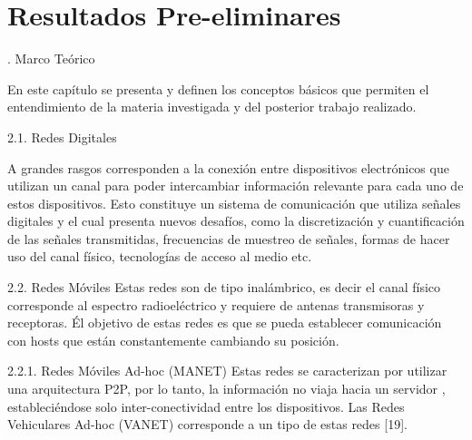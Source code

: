 \chapter{Resultados Pre-eliminares}
.	Marco Teórico

En este capítulo se presenta y definen los conceptos básicos que permiten el entendimiento de la materia investigada y del posterior trabajo realizado.

2.1.	Redes Digitales

A grandes rasgos corresponden  a la conexión  entre dispositivos electrónicos que utilizan un canal para poder intercambiar información relevante para cada uno de estos dispositivos. Esto constituye un sistema de comunicación que utiliza señales digitales y el cual presenta nuevos desafíos, como la discretización y cuantificación de las señales transmitidas, frecuencias de muestreo de señales, formas de hacer uso del canal físico, tecnologías de acceso al medio etc. 

2.2.	Redes Móviles
Estas redes son de tipo inalámbrico, es decir el canal físico corresponde al espectro radioeléctrico y requiere de antenas transmisoras y receptoras. Él objetivo de estas redes es que se pueda establecer comunicación con hosts que están constantemente cambiando su posición. 

2.2.1.	Redes Móviles Ad-hoc (MANET)
Estas redes se caracterizan por utilizar una arquitectura P2P, por  lo tanto, la información no viaja hacia un servidor , estableciéndose solo inter-conectividad entre los dispositivos. Las Redes Vehiculares Ad-hoc (VANET) corresponde a un tipo de estas redes  [19].

